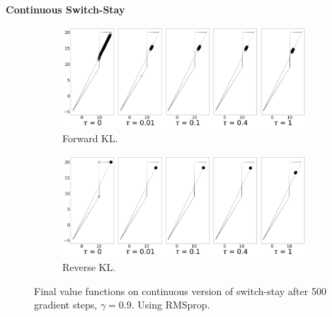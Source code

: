 \documentclass{article}
\begin{document}
\textbf{Continuous Switch-Stay}
\begin{figure}[!htb]
  \centering
  \begin{subfigure}[b]{0.5\linewidth}
    \centering
    \includegraphics[width=0.8\columnwidth]{figs/continuous-switch-stay/notlearnQ/polytope_forward_optim=rmsprop_lr=0.005.png}
    \caption{Forward KL.}
    \label{fig:cont-switch-stay-forward-rmsprop}
  \end{subfigure}%
  \begin{subfigure}[b]{0.5\linewidth}
        \centering
        \includegraphics[width=0.8\columnwidth]{figs/continuous-switch-stay/notlearnQ/polytope_reverse_optim=rmsprop_lr=0.005.png}
        \caption{Reverse KL.}
        \label{fig:cont-switch-stay-reverse-rmsprop}
  \end{subfigure}
  \caption{Final value functions on continuous version of switch-stay after 500 gradient steps, $\gamma = 0.9$. Using RMSprop.}
\end{figure}
\end{document}
